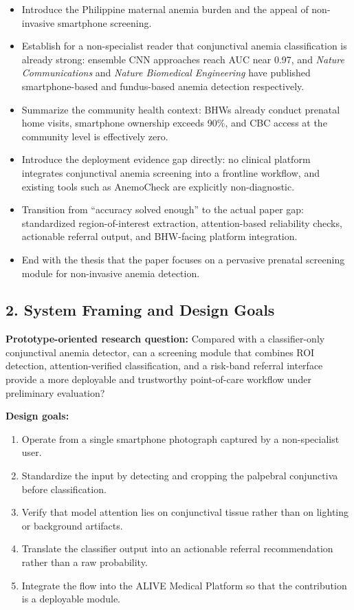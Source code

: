 \documentclass[11pt]{article}
\begin{document}
    \begin{itemize}[leftmargin=1.5em]
        \item Introduce the Philippine maternal anemia burden and the appeal of non-invasive smartphone screening.
        \item Establish for a non-specialist reader that conjunctival anemia classification is already strong: ensemble CNN approaches reach AUC near 0.97, and \emph{Nature Communications} and \emph{Nature Biomedical Engineering} have published smartphone-based and fundus-based anemia detection respectively.
        \item Summarize the community health context: BHWs already conduct prenatal home visits, smartphone ownership exceeds 90\%, and CBC access at the community level is effectively zero.
        \item Introduce the deployment evidence gap directly: no clinical platform integrates conjunctival anemia screening into a frontline workflow, and existing tools such as AnemoCheck are explicitly non-diagnostic.
        \item Transition from ``accuracy solved enough'' to the actual paper gap: standardized region-of-interest extraction, attention-based reliability checks, actionable referral output, and BHW-facing platform integration.
        \item End with the thesis that the paper focuses on a pervasive prenatal screening module for non-invasive anemia detection.
    \end{itemize}

    \subsection{2. System Framing and Design Goals}

    \textbf{Prototype-oriented research question:} Compared with a classifier-only conjunctival anemia detector, can a screening module that combines ROI detection, attention-verified classification, and a risk-band referral interface provide a more deployable and trustworthy point-of-care workflow under preliminary evaluation?

    \textbf{Design goals:}
    \begin{enumerate}[leftmargin=1.8em]
        \item Operate from a single smartphone photograph captured by a non-specialist user.
        \item Standardize the input by detecting and cropping the palpebral conjunctiva before classification.
        \item Verify that model attention lies on conjunctival tissue rather than on lighting or background artifacts.
        \item Translate the classifier output into an actionable referral recommendation rather than a raw probability.
        \item Integrate the flow into the ALIVE Medical Platform so that the contribution is a deployable module.
    \end{enumerate}
\end{document}
